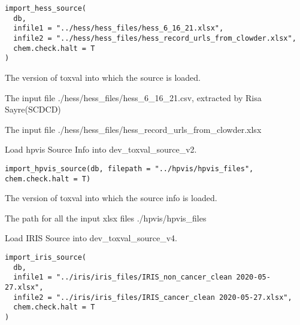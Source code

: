 \documentclass[letterpaper]{book}
\begin{document}
%
\begin{Usage}
\begin{verbatim}
import_hess_source(
  db,
  infile1 = "../hess/hess_files/hess_6_16_21.xlsx",
  infile2 = "../hess/hess_files/hess_record_urls_from_clowder.xlsx",
  chem.check.halt = T
)
\end{verbatim}
\end{Usage}
%
\begin{Arguments}
\begin{ldescription}
\item[\code{db}] The version of toxval into which the source is loaded.

\item[\code{infile1}] The input file ./hess/hess\_files/hess\_6\_16\_21.csv, extracted by Risa Sayre(SCDCD)

\item[\code{infile2}] The input file ./hess/hess\_files/hess\_record\_urls\_from\_clowder.xlsx
\end{ldescription}
\end{Arguments}
%
\begin{Description}\relax
Load hpvis Source Info into dev\_toxval\_source\_v2.
\end{Description}
%
\begin{Usage}
\begin{verbatim}
import_hpvis_source(db, filepath = "../hpvis/hpvis_files", chem.check.halt = T)
\end{verbatim}
\end{Usage}
%
\begin{Arguments}
\begin{ldescription}
\item[\code{db}] The version of toxval into which the source info is loaded.

\item[\code{filepath}] The path for all the input xlsx files ./hpvis/hpvis\_files
\end{ldescription}
\end{Arguments}
%
\begin{Description}\relax
Load IRIS Source into dev\_toxval\_source\_v4.
\end{Description}
%
\begin{Usage}
\begin{verbatim}
import_iris_source(
  db,
  infile1 = "../iris/iris_files/IRIS_non_cancer_clean 2020-05-27.xlsx",
  infile2 = "../iris/iris_files/IRIS_cancer_clean 2020-05-27.xlsx",
  chem.check.halt = T
)
\end{verbatim}
\end{Usage}
\end{document}
